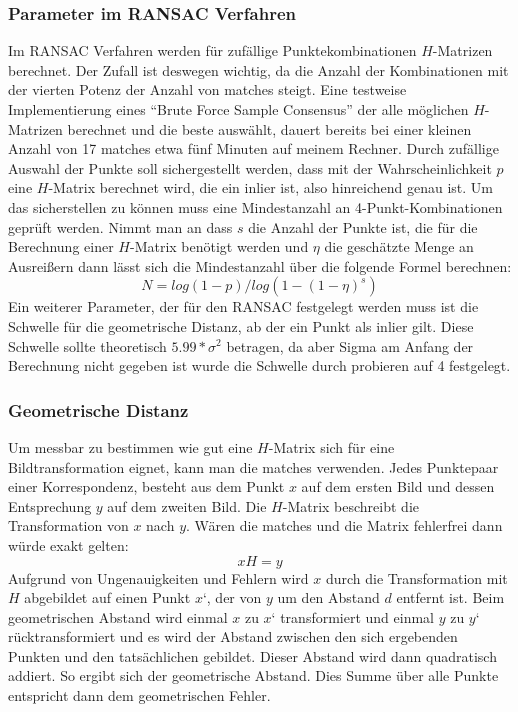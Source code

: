 \subsubsection{Parameter im RANSAC Verfahren}
Im RANSAC Verfahren werden für zufällige Punktekombinationen $H$-Matrizen berechnet. Der Zufall ist deswegen wichtig, da die Anzahl der Kombinationen mit der vierten Potenz der Anzahl von matches steigt. Eine testweise Implementierung eines “Brute Force Sample Consensus” der alle möglichen $H$-Matrizen berechnet und die beste auswählt, dauert bereits bei einer kleinen Anzahl von 17 matches etwa fünf Minuten auf meinem Rechner. Durch zufällige Auswahl der Punkte soll sichergestellt werden, dass mit der  Wahrscheinlichkeit $p$ eine $H$-Matrix berechnet wird, die ein inlier ist, also hinreichend genau ist. Um das sicherstellen zu können muss eine Mindestanzahl an 4-Punkt-Kombinationen geprüft werden. Nimmt man an dass $s$ die Anzahl der Punkte ist, die für die Berechnung einer $H$-Matrix benötigt werden und $\eta$ die geschätzte Menge an Ausreißern dann lässt sich die Mindestanzahl über die folgende Formel berechnen:
$$N=log(1-p)/log(1-(1-\eta)^s)$$
Ein weiterer Parameter, der für den RANSAC festgelegt werden muss ist die Schwelle für die geometrische Distanz, ab der ein Punkt als inlier gilt. Diese Schwelle sollte theoretisch $5.99*\sigma ^2$ betragen, da aber Sigma am Anfang der Berechnung nicht gegeben ist wurde die Schwelle durch probieren auf 4 festgelegt.

\subsubsection{Geometrische Distanz}
Um messbar zu bestimmen wie gut eine $H$-Matrix sich für eine Bildtransformation eignet, kann man die matches verwenden. Jedes Punktepaar einer Korrespondenz, besteht aus dem Punkt $x$ auf dem ersten Bild und dessen Entsprechung $y$ auf dem zweiten Bild. Die $H$-Matrix beschreibt die Transformation von $x$ nach $y$. Wären die matches und die Matrix fehlerfrei dann würde exakt gelten:
$$x H= y$$
Aufgrund von Ungenauigkeiten und Fehlern wird $x$ durch die Transformation mit $H$ abgebildet auf einen Punkt $x‘$, der von $y$ um den Abstand $d$ entfernt ist. Beim geometrischen Abstand wird einmal $x$ zu $x‘$ transformiert und einmal $y$ zu $ y‘$ rücktransformiert und es wird der Abstand zwischen den sich ergebenden Punkten und den tatsächlichen gebildet. Dieser Abstand wird dann quadratisch addiert. So ergibt sich der geometrische Abstand. Dies Summe über alle Punkte entspricht dann dem geometrischen Fehler. 

